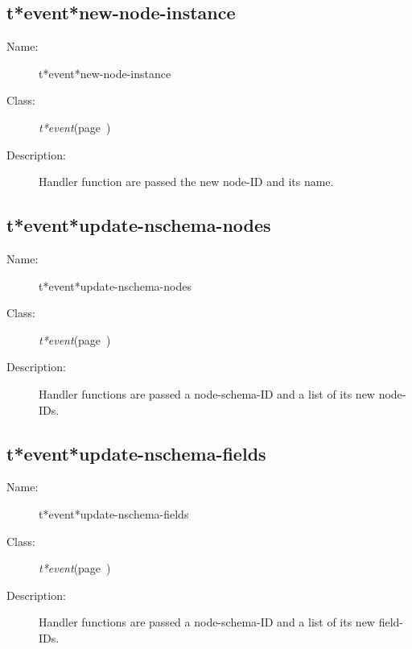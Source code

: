 \subsection{t*event*new-node-instance}
\label{t*event*new-node-instance}

\begin{description}
\item [Name:]  t*event*new-node-instance

\item [Class:] {\sl t*event}\hfill(page~\pageref{t*event})

\item [Description:]

Handler function are passed the new node-ID and
its name.


\end{description}
\horizontalline

\subsection{t*event*update-nschema-nodes}
\label{t*event*update-nschema-nodes}

\begin{description}
\item [Name:]  t*event*update-nschema-nodes

\item [Class:] {\sl t*event}\hfill(page~\pageref{t*event})

\item [Description:]

Handler functions are passed a node-schema-ID and
a list of its new node-IDs.


\end{description}
\horizontalline

\subsection{t*event*update-nschema-fields}
\label{t*event*update-nschema-fields}

\begin{description}
\item [Name:]  t*event*update-nschema-fields

\item [Class:] {\sl t*event}\hfill(page~\pageref{t*event})

\item [Description:]

Handler functions are passed a node-schema-ID and
a list of its new field-IDs.


\end{description}
\horizontalline

